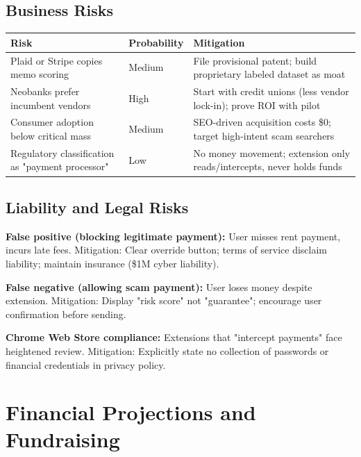 \documentclass[12pt]{article}
\begin{document}
\subsection{Business Risks}

\begin{longtable}{|p{}|p{}|p{}|}
\hline
\textbf{Risk} & \textbf{Probability} & \textbf{Mitigation} \\
\hline
Plaid or Stripe copies memo scoring & Medium & File provisional patent; build proprietary labeled dataset as moat \\
\hline
Neobanks prefer incumbent vendors & High & Start with credit unions (less vendor lock-in); prove ROI with pilot \\
\hline
Consumer adoption below critical mass & Medium & SEO-driven acquisition costs \$0; target high-intent scam searchers \\
\hline
Regulatory classification as "payment processor" & Low & No money movement; extension only reads/intercepts, never holds funds \\
\hline
\end{longtable}

\subsection{Liability and Legal Risks}

\textbf{False positive (blocking legitimate payment):} User misses rent payment, incurs late fees. Mitigation: Clear override button; terms of service disclaim liability; maintain insurance (\$1M cyber liability).

\textbf{False negative (allowing scam payment):} User loses money despite extension. Mitigation: Display "risk score" not "guarantee"; encourage user confirmation before sending.

\textbf{Chrome Web Store compliance:} Extensions that "intercept payments" face heightened review. Mitigation: Explicitly state no collection of passwords or financial credentials in privacy policy.

\newpage
\section{Financial Projections and Fundraising}
\end{document}

